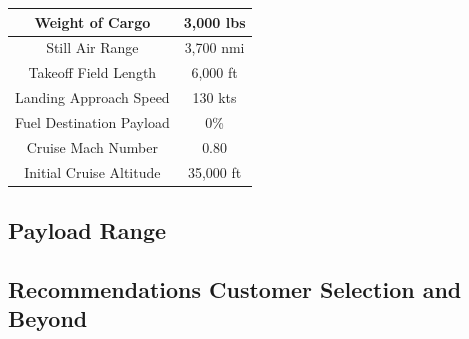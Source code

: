 \documentclass{article}
\begin{document}
\begin{flushleft}
\begin{table}[ht]
\begin{tabular}{|c|c|}
                    \rowcolor[HTML]{C0C0C0}
                    Weight of Cargo                       & 3,000 lbs                        \\ \hline
                    Still Air Range                       & 3,700 nmi                        \\ \hline
                    \rowcolor[HTML]{C0C0C0}
                    Takeoff Field Length                  & 6,000 ft                         \\ \hline
                    Landing Approach Speed                & 130 kts                          \\ \hline
                    \rowcolor[HTML]{C0C0C0}
                    Fuel Destination Payload              & 0\%                              \\ \hline
                    Cruise Mach Number                    & 0.80                             \\ \hline
                    \rowcolor[HTML]{C0C0C0}
                    Initial Cruise Altitude               & 35,000 ft                        \\ \hline
                \end{tabular}
                \end{table}

        \end{flushleft}

    \subsection{Payload Range}
    \label{sec:PR}

    \subsection{Recommendations Customer Selection and Beyond}
    \label{sec:Recommendations}
        \begin{flushleft}

        \end{flushleft}
\end{document}
